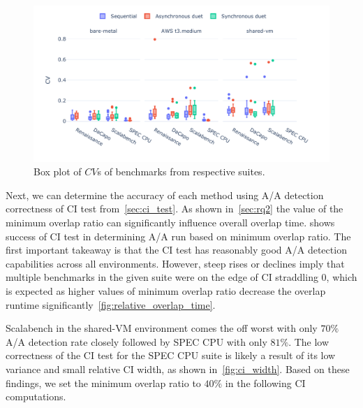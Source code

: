 \begin{figure}
	\centering
	\includegraphics[width=1\linewidth]{./figures/cv.pdf}
	\caption{
		Box plot of $CV$s of benchmarks from respective suites.
	}
	\label{fig:cv}
\end{figure}

Next, we can determine the accuracy of each method using A/A detection correctness of CI test from~\cref{sec:ci_test}.
As shown in~\cref{sec:rq2} the value of the minimum overlap ratio can significantly influence overall overlap time.
 shows success of CI test in determining A/A run based on minimum overlap ratio.
The first important takeaway is that the CI test has reasonably good A/A detection capabilities across all environments.
However, steep rises or declines imply that multiple benchmarks in the given suite were on the edge of CI straddling $0$, which is expected as higher values of minimum overlap ratio decrease the overlap runtime significantly~\ref{fig:relative_overlap_time}.

Scalabench in the \mbox{shared-VM} environment comes the off worst with only $70\%$ A/A detection rate closely followed by SPEC CPU with only $81\%$.
The low correctness of the CI test for the SPEC CPU suite is likely a result of its low variance and small relative CI width, as shown in~\cref{fig:ci_width}.
Based on these findings, we set the minimum overlap ratio to $40\%$ in the following CI computations.

